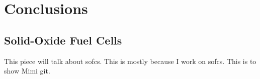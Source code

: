 


\chapter{Conclusions}

\section{Solid-Oxide Fuel Cells}

This piece will talk about \glspl{sofc}.
This is mostly because I work on \glspl{sofc}.
This is to show Mimi git.
\lipsum\cite{Wang2006}
